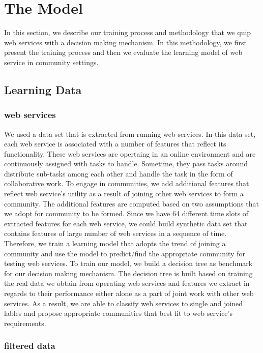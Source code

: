 \documentclass[10pt,journal,cspaper,compsoc]{IEEEtran}
\begin{document}
\section{The Model}\label{s:model}

In this section, we describe our training process and methodology that we quip web services with a decision making mechanism. In this methodology, we first present the training process and then we evaluate the learning model of web service in community settings.

\subsection{Learning Data}\label{ss:learningdata}


\subsubsection{web services}\label{sss:webservices}

We used a data set that is extracted from running web services. In this data set, each web service is associated with a number of features that reflect its functionality. These web services are opertaing in an online environment and are continuously assigned with tasks to handle. Sometime, they pass tasks around distribute sub-tasks among each other and handle the task in the form of collaborative work. To engage in communities, we add additional features that reflect web service’s utility as a result of joining other web services to form a community. The additional features are computed based on two assumptions that we adopt for community to be formed. Since we have 64 different time slots of extracted features for each web service, we could build synthetic data set that contains features of large number of web services in a sequence of time. Therefore, we train a learning model that adopts the trend of joining a community and use the model to predict/find the appropriate community for testing web services. To train our model, we build a decision tree as benchmark for our decision making mechanism. The decision tree is built based on training the real data we obtain from operating web services and features we extract in regards to their performance either alone as a part of joint work with other web services. As a result, we are able to classify web services to single and joined lables and propose appropriate communities that best fit to web service’s requirements. 

\subsubsection{filtered data}\label{sss:filtereddata}
\end{document}
